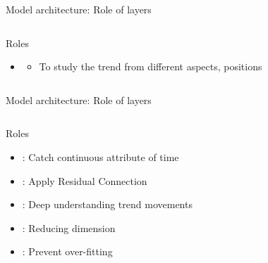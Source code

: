 \documentclass[compress, mathserif, fleqn, 10pt]{beamer}
\begin{document}
\begin{frame}{Model architecture: Role of layers}
\begin{columns}
\begin{column}{0.55\textwidth}
\begin{block}{Roles}
\begin{itemize}
						\item {}
						\begin{itemize}
							\item To study the trend from different aspects, positions
							\smallskip
						\end{itemize}
					\end{itemize}
				\end{block}
			\end{column}
		\end{columns}
	\end{frame}
	
	\begin{frame}{Model architecture: Role of layers}
		\begin{columns}
			\begin{column}{0.55\textwidth}
				\begin{block}{Roles}
					\begin{itemize}
						\item {}: Catch continuous attribute of time
						
						\item {}: Apply Residual Connection
						
						\item {}: Deep understanding trend movements
						
						\item {}: Reducing dimension
						
						\item {}: Prevent over-fitting
						

\end{itemize}
\end{block}
\end{column}
\end{columns}
\end{frame}
\end{document}
